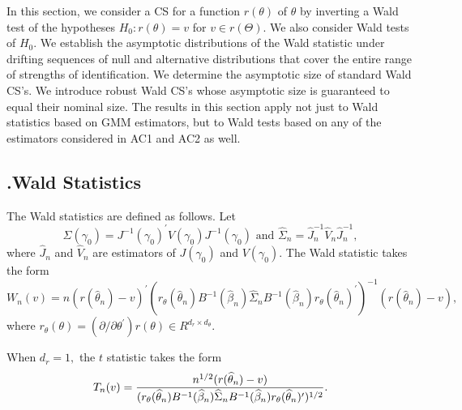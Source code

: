 \documentclass[12pt,thmsb,titlepage,final,oneside,letterpaper]{article}
\begin{document}
\setcounter{equation}{0}\hspace{0.25in}In this section, we consider a CS for
a function $r(\theta )$ of $\theta $ by inverting a Wald test of the
hypotheses $H_{0}:r(\theta )=v$ for $v\in r(\Theta ).$ We also consider Wald
tests of $H_{0}.$ We establish the asymptotic distributions of the Wald
statistic under drifting sequences of null and alternative distributions
that cover the entire range of strengths of identification. We determine the
asymptotic size of standard Wald CS's. We introduce robust Wald CS's whose
asymptotic size is guaranteed to equal their nominal size. The results in
this section apply not just to Wald statistics based on GMM estimators, but
to Wald tests based on any of the estimators considered in AC1 and AC2 as
well.

\subsection{\hspace{-0.23in}\textbf{.}\hspace{0.18in}Wald Statistics}

\hspace{0.25in}The Wald statistics are defined as follows. Let%
\begin{equation}
\Sigma (\gamma _{0})=J^{-1}\left( \gamma _{0}\right) ^{\prime }V(\gamma
_{0})J^{-1}(\gamma _{0})\text{ and }\widehat{\Sigma }_{n}=\widehat{J}%
_{n}^{-1}\widehat{V}_{n}\widehat{J}_{n}^{-1},  \label{Variance Matrix Defns}
\end{equation}%
where $\widehat{J}_{n}$ and $\widehat{V}_{n}$ are estimators of $J(\gamma
_{0})$ and $V(\gamma _{0}).$ The Wald statistic takes the form%
\begin{equation}
W_{n}(v)=n(r(\widehat{\theta }_{n})-v)^{\prime }(r_{\theta }(\widehat{\theta 
}_{n})B^{-1}(\widehat{\beta }_{n})\widehat{\Sigma }_{n}B^{-1}(\widehat{\beta 
}_{n})r_{\theta }(\widehat{\theta }_{n})^{\prime })^{-1}(r(\widehat{\theta }%
_{n})-v),  \label{Defn Wald}
\end{equation}%
where $r_{\theta }(\theta )=(\partial /\partial \theta ^{\prime })r(\theta
)\in R^{d_{r}\times d_{\theta }}.$

When $d_{r}=1,$ the $t$ statistic takes the form%
\begin{equation}
T_{n}(v)=\frac{n^{1/2}(r(\widehat{\theta }_{n})-v)}{(r_{\theta }(\widehat{%
\theta }_{n})B^{-1}(\widehat{\beta }_{n})\widehat{\Sigma }_{n}B^{-1}(%
\widehat{\beta }_{n})r_{\theta }(\widehat{\theta }_{n})^{\prime })^{1/2}}.
\label{Defn T}
\end{equation}
\end{document}
